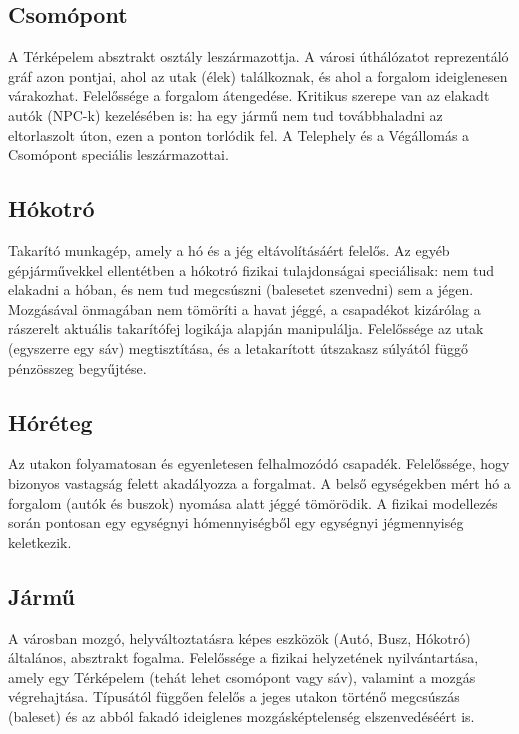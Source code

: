 \subsection{Csomópont}
\par{A Térképelem absztrakt osztály leszármazottja. A városi úthálózatot reprezentáló gráf azon pontjai, ahol az utak (élek) találkoznak, és ahol a forgalom ideiglenesen várakozhat. Felelőssége a forgalom átengedése. Kritikus szerepe van az elakadt autók (NPC-k) kezelésében is: ha egy jármű nem tud továbbhaladni az eltorlaszolt úton, ezen a ponton torlódik fel. A Telephely és a Végállomás a Csomópont speciális leszármazottai.}

\subsection{Hókotró}
\par{Takarító munkagép, amely a hó és a jég eltávolításáért felelős. Az egyéb gépjárművekkel ellentétben a hókotró fizikai tulajdonságai speciálisak: nem tud elakadni a hóban, és nem tud megcsúszni (balesetet szenvedni) sem a jégen. Mozgásával önmagában nem tömöríti a havat jéggé, a csapadékot kizárólag a rászerelt aktuális takarítófej logikája alapján manipulálja. Felelőssége az utak (egyszerre egy sáv) megtisztítása, és a letakarított útszakasz súlyától függő pénzösszeg begyűjtése.}

\subsection{Hóréteg}
\par{Az utakon folyamatosan és egyenletesen felhalmozódó csapadék. Felelőssége, hogy bizonyos vastagság felett akadályozza a forgalmat. A belső egységekben mért hó a forgalom (autók és buszok) nyomása alatt jéggé tömörödik. A fizikai modellezés során pontosan egy egységnyi hómennyiségből egy egységnyi jégmennyiség keletkezik.}

\subsection{Jármű}
\par{A városban mozgó, helyváltoztatásra képes eszközök (Autó, Busz, Hókotró) általános, absztrakt fogalma. Felelőssége a fizikai helyzetének nyilvántartása, amely egy Térképelem (tehát lehet csomópont vagy sáv), valamint a mozgás végrehajtása. Típusától függően felelős a jeges utakon történő megcsúszás (baleset) és az abból fakadó ideiglenes mozgásképtelenség elszenvedéséért is.}

